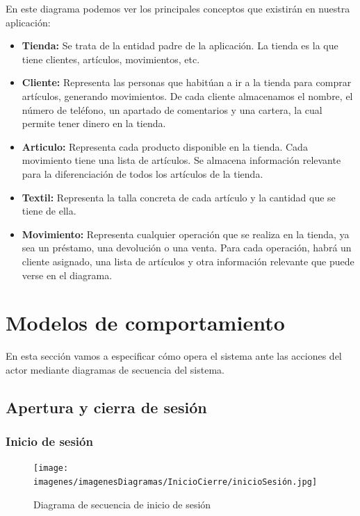En este diagrama podemos ver los principales conceptos que existirán en nuestra aplicación: 

\begin{itemize}
	\item \textbf{Tienda:} Se trata de la entidad padre de la aplicación. La tienda es la que tiene clientes, artículos, movimientos, etc. 
	\item \textbf{Cliente:} Representa las personas que habitúan a ir a la tienda para comprar artículos, generando movimientos. De cada cliente almacenamos el nombre, el número de teléfono, un apartado de comentarios y una cartera, la cual permite tener dinero en la tienda. 
	\item \textbf{Articulo:} Representa cada producto disponible en la tienda. Cada movimiento tiene una lista de artículos. Se almacena información relevante para la diferenciación de todos los artículos de la tienda. 
	\item \textbf{Textil:} Representa la talla concreta de cada artículo y la cantidad que se tiene de ella. 
	\item \textbf{Movimiento:} Representa cualquier operación que se realiza en la tienda, ya sea un préstamo, una devolución o una venta. Para cada operación, habrá un cliente asignado, una lista de artículos y otra información relevante que puede verse en el diagrama. 	
\end{itemize}


\newpage


\section{Modelos de comportamiento}

En esta sección vamos a especificar cómo opera el sistema ante las acciones del actor mediante diagramas de secuencia del sistema. 

\subsection{Apertura y cierra de sesión}

\subsubsection{Inicio de sesión}

\begin{figure}[H]
	\centering
	\texttt{[image: imagenes/imagenesDiagramas/InicioCierre/inicioSesión.jpg]}
	\caption{Diagrama de secuencia de inicio de sesión}
	\label{fig:seqdiag1}
\end{figure}

